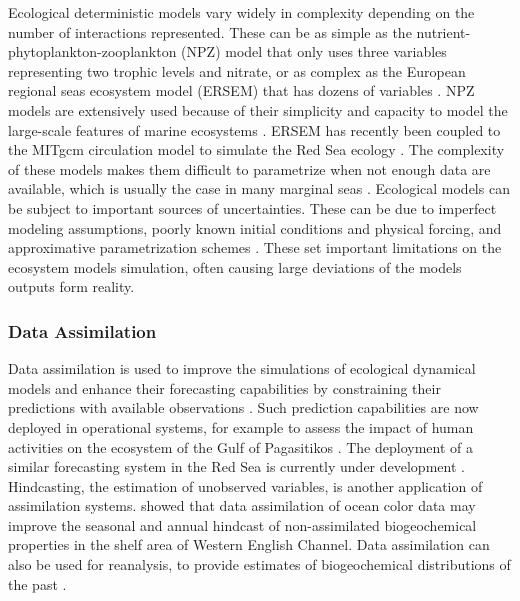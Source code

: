 Ecological deterministic models vary widely in complexity depending on the
number of interactions represented. These can be as simple as the
nutrient-phytoplankton-zooplankton (NPZ) model \citep{Anderson2005} that only
uses three variables representing two trophic levels and nitrate, or as complex
as the European regional seas ecosystem model (ERSEM) that has dozens of
variables \citep{Baretta1995}. NPZ models are extensively used because of their
simplicity and capacity to model the large-scale features of marine ecosystems
\citep{Anderson2005}. ERSEM has recently been coupled to the MITgcm circulation
model to simulate the Red Sea ecology \citep{Triantafyllou2014}.  The
complexity of these models makes them difficult to parametrize when not enough
data are available, which is usually the case in many marginal seas
\citep{Anderson2005}. Ecological models can be subject to important sources of
uncertainties. These can be due to imperfect modeling assumptions, poorly known
initial conditions and physical forcing, and approximative parametrization
schemes \citep{Edwards2015}.  These set important limitations on the ecosystem
models simulation, often causing large deviations of the models outputs form
reality.

\subsubsection{Data Assimilation}

Data assimilation is used to improve the simulations of ecological dynamical
models and enhance their forecasting capabilities by constraining their
predictions with available observations \citep{Edwards2015}. Such prediction
capabilities are now deployed in operational systems, for example to assess
the impact of human activities on the ecosystem of the Gulf of Pagasitikos
\citep{Korres2012}. The deployment of a similar forecasting system in the Red
Sea is currently under development \citep{Triantafyllou2014}. Hindcasting, the
estimation of unobserved variables, is another application of assimilation
systems. \citet{Ciavatta2011} showed that data assimilation of ocean color data
may improve the seasonal and annual hindcast of non-assimilated biogeochemical
properties in the shelf area of Western English Channel. Data assimilation can
also be used for reanalysis, to provide estimates of biogeochemical
distributions of the past \citep{Fontana2013}.

